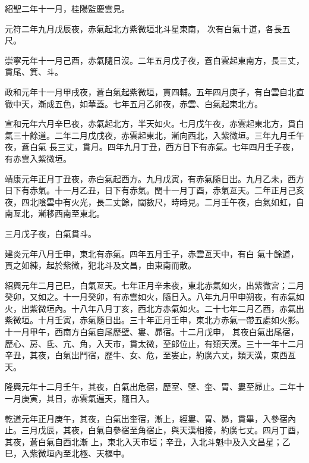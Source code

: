\begin{pinyinscope}
 紹聖二年十一月，桂陽監慶雲見。



 元符二年九月戊辰夜，赤氣起北方紫微垣北斗星東南，
 次有白氣十道，各長五尺。



 崇寧元年十一月己酉，赤氣隨日沒。二年五月戊子夜，蒼白雲起東南方，長三丈，貫尾、箕、斗。



 政和元年十一月甲戌夜，蒼白氣起紫微垣，貫四輔。五年四月庚子，有白雲自北直徹中天，漸成五色，如華蓋。七年五月乙卯夜，赤雲、白氣起東北方。



 宣和元年六月辛巳夜，赤氣起北方，半天如火。七月戊午夜，赤雲起東北方，貫白氣三十餘道。二年二月戊戌夜，赤雲起東北，漸向西北，入紫微垣。三年九月壬午夜，蒼白氣
 長三丈，貫月。四年九月丁丑，西方日下有赤氣。七年四月壬子夜，有赤雲入紫微垣。



 靖康元年正月丁丑夜，赤白氣起西方。九月戊寅，有赤氣隨日出。九月乙未，西方日下有赤氣。十一月乙丑，日下有赤氣。閏十一月丁酉，赤氣亙天。二年正月己亥夜，四北陰雲中有火光，長二丈餘，闊數尺，時時見。二月壬午夜，白氣如虹，自南亙北，漸移西南至東北。



 三月戊子夜，白氣貫斗。



 建炎元年八月壬申，東北有赤氣。四年五月壬子，赤雲亙天中，有白
 氣十餘道，貫之如練，起於紫微，犯北斗及文昌，由東南而散。



 紹興元年二月己巳，白氣亙天。七年正月辛未夜，東北赤氣如火，出紫微宮；二月癸卯，又如之。十一月癸卯，有赤雲如火，隨日入。八年九月甲申朔夜，有赤氣如火，出紫微垣內。十八年八月丁亥，西北方赤氣如火。二十七年二月乙酉，赤氣出紫微垣。十月壬寅，赤氣隨日出。三十年正月壬申，東北方赤氣一帶五處如火影。十一月甲午，西南方白氣自尾歷壁、婁、昴宿。十二月戊申，
 其夜白氣出尾宿，歷心、房、氐、亢、角，入天市，貫太微，至郎位止，有類天漢。三十一年十二月辛丑，其夜，白氣出鬥宿，歷牛、女、危，至婁止，約廣六丈，類天漢，東西亙天。



 隆興元年十二月壬午，其夜，白氣出危宿，歷室、壁、奎、胃、婁至昴止。二年十一月庚寅，其日，赤雲氣遍天，隨日入。



 乾道元年正月庚午，其夜，白氣出奎宿，漸上，經婁、胃、昴，貫畢，入參宿內止。三月戊辰，其夜，白氣自參宿至角宿止，與天漢相接，約廣七丈。四月丁酉，其夜，蒼白氣自西北漸
 上，東北入天市垣；辛丑，入北斗魁中及入文昌星；乙巳，入紫微垣內至北極、天樞中。




\end{pinyinscope}

